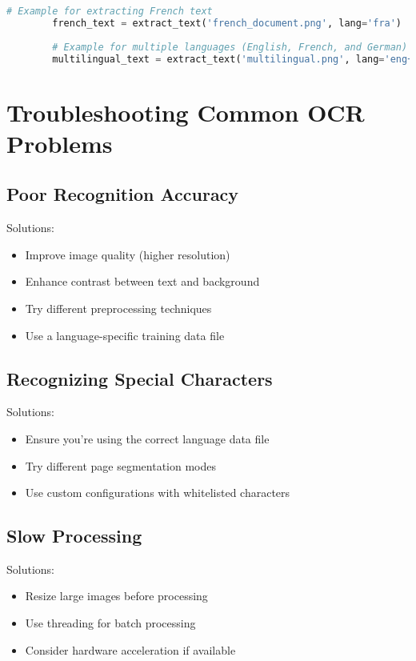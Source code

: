 \documentclass{book}
\begin{document}
	\begin{lstlisting}[language=Python]
		# Example for extracting French text
		french_text = extract_text('french_document.png', lang='fra')
		
		# Example for multiple languages (English, French, and German)
		multilingual_text = extract_text('multilingual.png', lang='eng+fra+deu')
	\end{lstlisting}
	
	\section{Troubleshooting Common OCR Problems}
	
	\subsection{Poor Recognition Accuracy}
	Solutions:
	\begin{itemize}
		\item Improve image quality (higher resolution)
		\item Enhance contrast between text and background
		\item Try different preprocessing techniques
		\item Use a language-specific training data file
	\end{itemize}
	
	\subsection{Recognizing Special Characters}
	Solutions:
	\begin{itemize}
		\item Ensure you're using the correct language data file
		\item Try different page segmentation modes
		\item Use custom configurations with whitelisted characters
	\end{itemize}
	
	\subsection{Slow Processing}
	Solutions:
	\begin{itemize}
		\item Resize large images before processing
		\item Use threading for batch processing
		\item Consider hardware acceleration if available
	\end{itemize}
	
\end{document}
